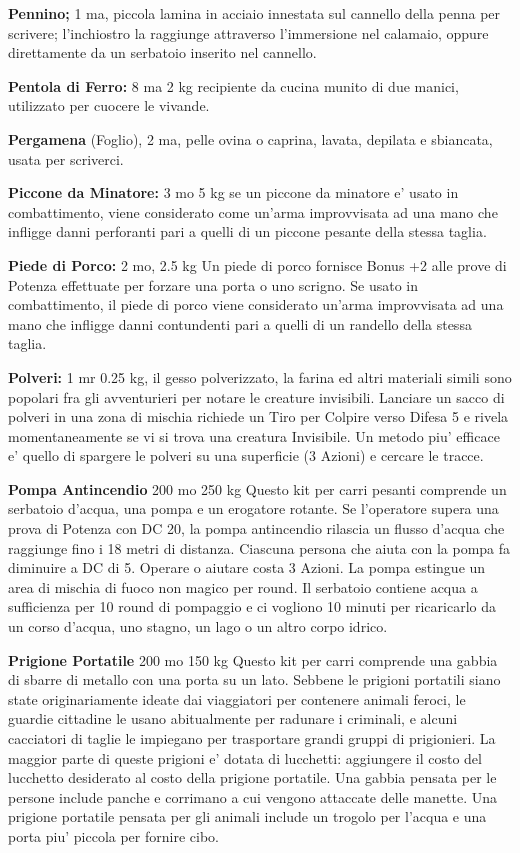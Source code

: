 \documentclass[a4paper,11pt,twoside,openany]{dndbook}
\begin{document}
{\textbf{Pennino;} 1 ma, piccola lamina in acciaio innestata sul cannello della penna per scrivere; l'inchiostro la raggiunge attraverso l'immersione nel calamaio, oppure direttamente da un serbatoio inserito nel cannello.

\textbf{Pentola di Ferro:} 8 ma 2 kg recipiente da cucina munito di due manici, utilizzato per cuocere le vivande.

\textbf{Pergamena} (Foglio), 2 ma, pelle ovina o caprina, lavata, depilata e sbiancata, usata per scriverci.

\textbf{Piccone da Minatore:} 3 mo 5 kg se un piccone da minatore e' usato in combattimento, viene considerato come un'arma improvvisata ad una mano che infligge danni perforanti pari a quelli di un piccone pesante della stessa taglia.

\textbf{Piede di Porco:} 2 mo, 2.5 kg Un piede di porco fornisce Bonus +2 alle prove di Potenza effettuate per forzare una porta o uno scrigno. Se usato in combattimento, il piede di porco viene considerato un'arma improvvisata ad una mano che infligge danni contundenti pari a quelli di un randello della stessa taglia.

\textbf{Polveri:} 1 mr 0.25 kg, il gesso polverizzato, la farina ed altri materiali simili sono popolari fra gli avventurieri per notare le creature invisibili. Lanciare un sacco di polveri in una zona di mischia richiede un Tiro per Colpire verso Difesa 5 e rivela momentaneamente se vi si trova una creatura Invisibile. Un metodo piu' efficace e' quello di spargere le polveri su una superficie (3 Azioni) e cercare le tracce.

\textbf{Pompa Antincendio} 200 mo 250 kg Questo kit per carri pesanti comprende un serbatoio d'acqua, una pompa e un erogatore rotante. Se l'operatore supera una prova di Potenza con DC 20, la pompa antincendio rilascia un flusso d'acqua che raggiunge fino i 18 metri di distanza. Ciascuna persona che aiuta con la pompa fa diminuire a DC di 5. Operare o aiutare costa 3 Azioni. La pompa estingue un area di mischia di fuoco non magico per round. Il serbatoio contiene acqua a sufficienza per 10 round di pompaggio e ci vogliono 10 minuti per ricaricarlo da un corso d'acqua, uno stagno, un lago o un altro corpo idrico.

\textbf{Prigione Portatile} 200 mo 150 kg Questo kit per carri comprende una gabbia di sbarre di metallo con una porta su un lato. Sebbene le prigioni portatili siano state originariamente ideate dai viaggiatori per contenere animali feroci, le guardie cittadine le usano abitualmente per radunare i criminali, e alcuni cacciatori di taglie le impiegano per trasportare grandi gruppi di prigionieri. La maggior parte di queste prigioni e' dotata di lucchetti: aggiungere il costo del lucchetto desiderato al costo della prigione portatile. Una gabbia pensata per le persone include panche e corrimano a cui vengono attaccate delle manette. Una prigione portatile pensata per gli animali include un trogolo per l'acqua e una porta piu' piccola per fornire cibo.

}
\end{document}
